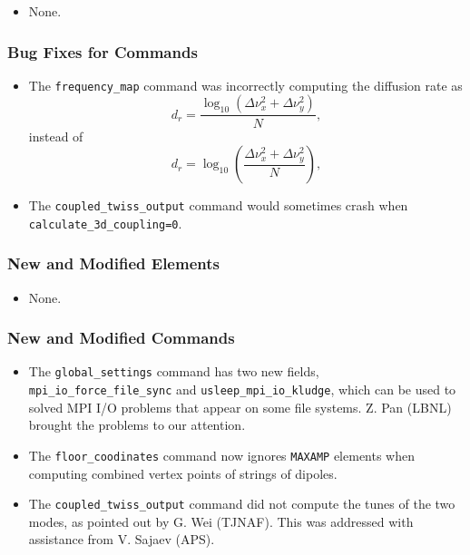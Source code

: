 \documentclass[11pt]{article}
\begin{document}
\begin{itemize}
\item None.
\end{itemize}

\subsubsection{Bug Fixes for Commands}
\begin{itemize}
\item The \verb|frequency_map| command was incorrectly computing the diffusion rate as 
\begin{equation}
  d_r = \frac{\log_{10} \left(\Delta\nu_x^2 + \Delta\nu_y^2\right)}{N},
\end{equation}
instead of
\begin{equation}
  d_r = \log_{10} \left(\frac{\Delta\nu_x^2 + \Delta\nu_y^2}{N}\right),
\end{equation}
\item The \verb|coupled_twiss_output| command would sometimes crash when \verb|calculate_3d_coupling=0|. 
\end{itemize}

\subsubsection{New and Modified Elements}
\begin{itemize}
\item None.
\end{itemize}

\subsubsection{New and Modified Commands}
\begin{itemize}
\item The \verb|global_settings| command has two new fields, \verb|mpi_io_force_file_sync| and \verb|usleep_mpi_io_kludge|,
  which can be used to solved MPI I/O problems that appear on some file systems. Z. Pan (LBNL) brought the problems to our
  attention.
\item The \verb|floor_coodinates| command now ignores \verb|MAXAMP| elements when computing combined vertex points
  of strings of dipoles.
\item The \verb|coupled_twiss_output| command did not compute the tunes of the two modes, as pointed out by
  G. Wei (TJNAF). This was addressed with assistance from V. Sajaev (APS).
\end{itemize}
\end{document}
